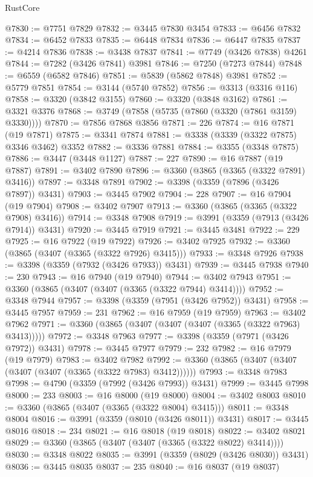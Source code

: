 \begin{lexlean}{RustCore}
\begin{coremodule}
@7830 := @7751 @7829
@7832 := @3445 @7830 @3454
@7833 := @6456 @7832
@7834 := @6452 @7833
@7835 := @6448 @7834
@7836 := @6447 @7835
@7837 := @4214 @7836
@7838 := @3438 @7837
@7841 := @7749 (@3426 @7838) @4261
@7844 := @7282 (@3426 @7841) @3981
@7846 := @7250 (@7273 @7844)
@7848 := @6559 (@6582 @7846)
@7851 := @5839 (@5862 @7848) @3981
@7852 := @5779 @7851
@7854 := @3144 (@5740 @7852)
@7856 := @3313 (@3316 @116)
@7858 := @3320 (@3842 @3155)
@7860 := @3320 (@3848 @3162)
@7861 := @3321 @3376
@7868 := @3749 (@7858 (@5735 (@7860 (@3320 (@7861 @3159) @3330))))
@7870 := @7856 @7868 @3856
@7871 := 226
@7874 := @16 @7871 (@19 @7871)
@7875 := @3341 @7874
@7881 := @3338 (@3339 (@3322 @7875) @3346 @3462) @3352
@7882 := @3336 @7881
@7884 := @3355 (@3348 @7875)
@7886 := @3447 (@3448 @1127)
@7887 := 227
@7890 := @16 @7887 (@19 @7887)
@7891 := @3402 @7890
@7896 := @3360 (@3865 (@3365 (@3322 @7891) @3416))
@7897 := @3348 @7891
@7902 := @3398 (@3359 (@7896 (@3426 @7897)) @3431)
@7903 := @3445 @7902
@7904 := 228
@7907 := @16 @7904 (@19 @7904)
@7908 := @3402 @7907
@7913 := @3360 (@3865 (@3365 (@3322 @7908) @3416))
@7914 := @3348 @7908
@7919 := @3991 (@3359 (@7913 (@3426 @7914)) @3431)
@7920 := @3445 @7919
@7921 := @3445 @3481
@7922 := 229
@7925 := @16 @7922 (@19 @7922)
@7926 := @3402 @7925
@7932 := @3360 (@3865 (@3407 (@3365 (@3322 @7926) @3415)))
@7933 := @3348 @7926
@7938 := @3398 (@3359 (@7932 (@3426 @7933)) @3431)
@7939 := @3445 @7938
@7940 := 230
@7943 := @16 @7940 (@19 @7940)
@7944 := @3402 @7943
@7951 := @3360 (@3865 (@3407 (@3407 (@3365 (@3322 @7944) @3414))))
@7952 := @3348 @7944
@7957 := @3398 (@3359 (@7951 (@3426 @7952)) @3431)
@7958 := @3445 @7957
@7959 := 231
@7962 := @16 @7959 (@19 @7959)
@7963 := @3402 @7962
@7971 := @3360 (@3865 (@3407 (@3407 (@3407 (@3365 (@3322 @7963) @3413)))))
@7972 := @3348 @7963
@7977 := @3398 (@3359 (@7971 (@3426 @7972)) @3431)
@7978 := @3445 @7977
@7979 := 232
@7982 := @16 @7979 (@19 @7979)
@7983 := @3402 @7982
@7992 := @3360 (@3865 (@3407 (@3407 (@3407 (@3407 (@3365 (@3322 @7983) @3412))))))
@7993 := @3348 @7983
@7998 := @4790 (@3359 (@7992 (@3426 @7993)) @3431)
@7999 := @3445 @7998
@8000 := 233
@8003 := @16 @8000 (@19 @8000)
@8004 := @3402 @8003
@8010 := @3360 (@3865 (@3407 (@3365 (@3322 @8004) @3415)))
@8011 := @3348 @8004
@8016 := @3991 (@3359 (@8010 (@3426 @8011)) @3431)
@8017 := @3445 @8016
@8018 := 234
@8021 := @16 @8018 (@19 @8018)
@8022 := @3402 @8021
@8029 := @3360 (@3865 (@3407 (@3407 (@3365 (@3322 @8022) @3414))))
@8030 := @3348 @8022
@8035 := @3991 (@3359 (@8029 (@3426 @8030)) @3431)
@8036 := @3445 @8035
@8037 := 235
@8040 := @16 @8037 (@19 @8037)

\end{coremodule}
\end{lexlean}

